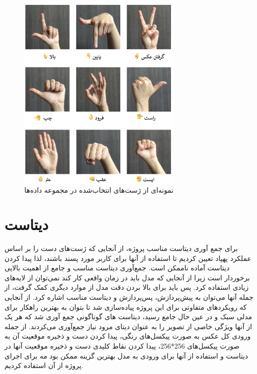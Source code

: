 \begin{figure}[h]
    \centering
    \includegraphics[width=0.7\textwidth]{gestures.png}
    \caption{نمونه‌ای از ژست‌های انتخاب‌شده در مجموعه داده‌ها}
\end{figure}

\section{دیتاست}
برای جمع آوری دیتاست مناسب پروژه، از آنجایی که ژست‌های دست را بر اساس عملکرد پهپاد تعیین کردیم تا استفاده از آنها برای کاربر مورد پسند باشند، لذا پیدا کردن دیتاست آماده ناممکن است. جمع‌آوری دیتاست مناسب و جامع از اهمیت 
بالایی برخوردار است زیرا از آنجایی که مدل باید در زمان واقعی کار کند نمی‌توان از لایه‌های زیادی استفاده کرد. پس باید برای بالا بردن دقت مدل از موارد دیگری کمک گرفت، از جمله آنها می‌توان به پیش‌پردازش، پس‌پردازش و دیتاست مناسب اشاره کرد.
از آنجایی که رویکردهای متفاوتی برای این پروژه پیاده‌سازی شد تا بتوان به بهترین راهکار برای مدلی سبک و در عین حال جامع رسید، دیتاست های گوناگونی جمع آوری شد که هر یک از آنها  ویژگی خاصی از تصویر را به عنوان دیتای 
مرود نیاز جمع‌آوری می‌کردند. از جمله ورودی کل عکس به صورت پیکسل‌های رنگی، پیدا کردن دست و ذخیره موقعیت آن به صورت پیکسل‌های 256*256، پیدا کردن نقاط کلیدی دست و ذخیره موقعیت آنها
در دیتاست و استفاده از آنها برای ورودی به مدل بهترین گزینه ممکن بود مه برای اجرای پروژه از آن استفاده کردیم.


